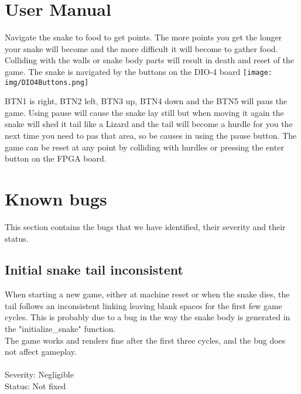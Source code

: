 \documentclass{acm_proc_article-sp}
\begin{document}


\appendix


%
%

\section{User Manual}
Navigate the snake to food to get points. The more points you get the longer your snake will become and the more difficult it will become to gather food.
Colliding with the walls or snake body parts will result in death and reset of the game. The snake is navigated by the buttons on the DIO-4 board 
\texttt{[image: img/DIO4Buttons.png]} 

BTN1 is right, BTN2 left, BTN3 up, BTN4 down and the BTN5 will paus the game. Using pause will cause the snake lay still but when moving it again the snake will shed it tail like a Lizard and the tail will become a hurdle for you the next time you need to pas that area, so be causes in using the pause button.
The game can be reset at any point by colliding with hurdles or pressing the enter button on the FPGA board.

\section{Known bugs}
This section contains the bugs that we have identified, their severity and their status.
\subsection{Initial snake tail inconsistent}
When starting a new game, either at machine reset or when the snake dies, the tail follows an inconsistent linking leaving blank spaces for the first few game cycles. This is probably due to a bug in the way the snake body is generated in the "initialize\_snake" function.\\
The game works and renders fine after the first three cycles, and the bug does not affect gameplay.\\\\
Severity: Negligible\\
Status: Not fixed
\end{document}
